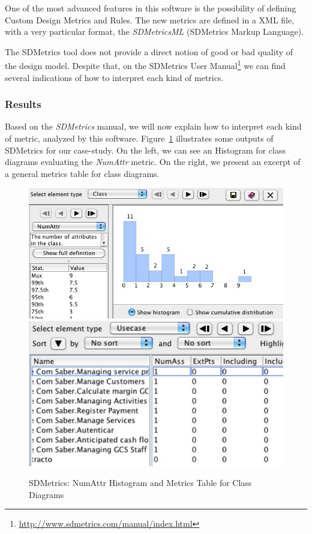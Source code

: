 One of the most advanced features in this software is the possibility of defining Custom Design Metrics and Rules. 
The new metrics are defined in a XML file, with a very particular format, the \textit{SDMetricsML} (SDMetrics Markup Language).

The SDMetrics tool does not provide a direct notion of good or bad quality of the design model. 
Despite that, on the SDMetrics User Manual\footnote{\url{http://www.sdmetrics.com/manual/index.html}} we can find several indications of how to interpret each kind of metrics. 
 
\subsubsection{Results}
Based on the \textit{SDMetrics} manual, we will now explain how to interpret each kind of metric, analyzed by this software. 
Figure~\ref{fig:sdmetrics} illustrates some outputs of SDMetrics for our case-study. 
On the left, we can see an Histogram for class diagrams evaluating the \textit{NumAttr} metric. On the right, we present an excerpt of a general metrics table for class diagrams.

\begin{figure}[htbp]
\includegraphics[scale=0.3]{images/histogram2}
\hspace{0.1cm}
\includegraphics[scale=0.32]{images/table3}
\caption{SDMetrics: \textsf{NumAttr} Histogram and Metrics Table for Class Diagrams}
\label{fig:sdmetrics}
\end{figure}


